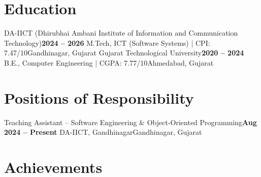 \documentclass[letterpaper,10pt]{article}
\begin{document}
\resumeSubHeadingListEnd

\vspace{-0.55em}
\section{Education}
\resumeSubHeadingListStart
    \resumeSubheading
    {DA-IICT (Dhirubhai Ambani Institute of Information and Communication Technology)}{\textbf{2024 -- 2026}}
    {M.Tech, ICT (Software Systems) $\vert$ CPI: 7.47/10}{Gandhinagar, Gujarat}
    \resumeSubheading
    {Gujarat Technological University}{\textbf{2020 -- 2024}}
    {B.E., Computer Engineering $\vert$ CGPA: 7.77/10}{Ahmedabad, Gujarat}
\resumeSubHeadingListEnd

\vspace{-0.55em}

\section{Positions of Responsibility}
\resumeSubHeadingListStart
    \resumeSubheading
    {Teaching Assistant -- Software Engineering \& Object-Oriented Programming}{\textbf{Aug 2024 -- Present}}
    {DA-IICT, Gandhinagar}{Gandhinagar, Gujarat}
    \resumeItemListStart
    \resumeItemListEnd
\resumeSubHeadingListEnd

\vspace{-0.55em}
\section{Achievements}
\vspace{-0.3em}
\resumeItemListStart
\resumeItemListEnd
\end{document}
